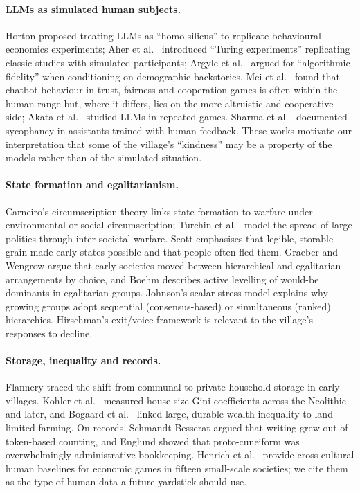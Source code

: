 \documentclass[11pt]{article}
\begin{document}
\paragraph{LLMs as simulated human subjects.}
Horton \citep{horton2023homo} proposed treating LLMs as ``homo silicus'' to replicate behavioural-economics experiments; Aher et al.\ \citep{aher2023using} introduced ``Turing experiments'' replicating classic studies with simulated participants; Argyle et al.\ \citep{argyle2023out} argued for ``algorithmic fidelity'' when conditioning on demographic backstories. Mei et al.\ \citep{mei2024turing} found that chatbot behaviour in trust, fairness and cooperation games is often within the human range but, where it differs, lies on the more altruistic and cooperative side; Akata et al.\ \citep{akata2025repeated} studied LLMs in repeated games. Sharma et al.\ \citep{sharma2024sycophancy} documented sycophancy in assistants trained with human feedback. These works motivate our interpretation that some of the village's ``kindness'' may be a property of the models rather than of the simulated situation.

\paragraph{State formation and egalitarianism.}
Carneiro's circumscription theory \citep{carneiro1970theory} links state formation to warfare under environmental or social circumscription; Turchin et al.\ \citep{turchin2013war} model the spread of large polities through inter-societal warfare. Scott \citep{scott2017against} emphasises that legible, storable grain made early states possible and that people often fled them. Graeber and Wengrow \citep{graeber2021dawn} argue that early societies moved between hierarchical and egalitarian arrangements by choice, and Boehm \citep{boehm1999hierarchy} describes active levelling of would-be dominants in egalitarian groups. Johnson's scalar-stress model \citep{johnson1982scalar} explains why growing groups adopt sequential (consensus-based) or simultaneous (ranked) hierarchies. Hirschman's exit/voice framework \citep{hirschman1970exit} is relevant to the village's responses to decline.

\paragraph{Storage, inequality and records.}
Flannery \citep{flannery2002origins} traced the shift from communal to private household storage in early villages. Kohler et al.\ \citep{kohler2017greater} measured house-size Gini coefficients across the Neolithic and later, and Bogaard et al.\ \citep{bogaard2019farming} linked large, durable wealth inequality to land-limited farming. On records, Schmandt-Besserat \citep{schmandt1992before} argued that writing grew out of token-based counting, and Englund \citep{englund2011accounting} showed that proto-cuneiform was overwhelmingly administrative bookkeeping. Henrich et al.\ \citep{henrich2005economic} provide cross-cultural human baselines for economic games in fifteen small-scale societies; we cite them as the type of human data a future yardstick should use.
\end{document}
